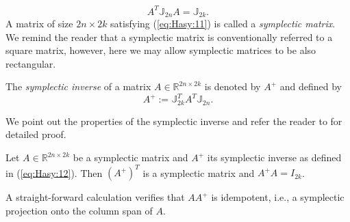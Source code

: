 \begin{equation} \label{eq:Hasy:11}
	A^T \mathbb{J}_{2n}A = \mathbb{J}_{2k}.
\end{equation}
A matrix of size $2n\times 2k$ satisfying (\ref{eq:Hasy:11}) is called a \emph{symplectic matrix}. {\blue We remind the reader that a symplectic matrix is conventionally referred to a square matrix, however, here we may allow symplectic matrices to be also rectangular.}

\begin{definition}
	The \emph{symplectic inverse} of a matrix $A\in \mathbb{R}^{2n\times 2k}$ is denoted by $A^+$ and defined by {\edit \cite{Peng:2014di}}
\begin{equation}\label{eq:Hasy:12}
	A^+ := \mathbb{J}_{2k}^T A^T \mathbb{J}_{2n}.
\end{equation}
\end{definition}
We point out the properties of the symplectic inverse and refer the reader to \cite{Peng:2014di} for detailed proof.
\begin{lemma} \label{lemma:Hasy:1}
Let $A\in \mathbb{R}^{2n\times 2k}$ be a symplectic matrix and $A^+$ its symplectic inverse as defined in (\ref{eq:Hasy:12}). Then ${(A^+)}^T$ is a symplectic matrix and $A^+A = I_{2k}$.
\end{lemma}

{\edit A straight-forward calculation verifies} that $AA^+$ is idempotent, i.e., a symplectic projection onto the column span of $A$.

